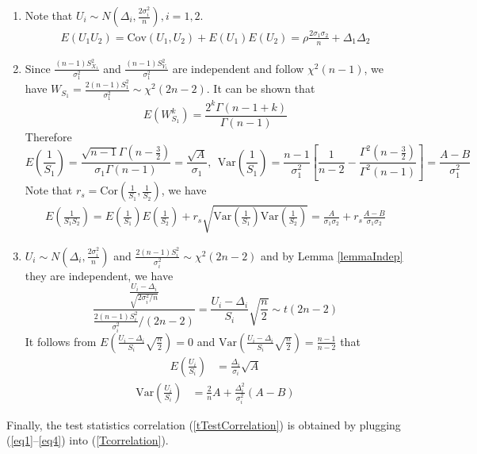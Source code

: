 \documentclass[11pt, a4paper]{article}
\begin{document}
\begin{enumerate}
	\item Note that $U_i\sim N(\Delta_i, \frac{2\sigma_i^2}{n}),  i=1, 2$. 
	\begin{align}\label{eq1}
	E(U_1U_2)= \text{Cov}(U_1, U_2) + E(U_1)E(U_2) = \rho \frac{2\sigma_1\sigma_2}{n} + \Delta_1\Delta_2
	\end{align} 
	\item Since $\frac{(n-1)S_{X_1}^2}{\sigma_1^2}$ and $\frac{(n-1)S_{Y_1}^2}{\sigma_1^2}$ are independent  and follow $\chi^2(n-1)$, we have $W_{S_1}=\frac{2(n-1)S_1^2}{\sigma_1^2}\sim \chi^2(2n-2)$. It can be shown that 
	\[E(W_{S_1}^k)= \frac{2^k\Gamma(n-1+k)}{\Gamma(n-1)}\] 
	Therefore 
	\[E\left(\frac{1}{S_1}\right) = \frac{\sqrt{n-1}\Gamma(n-\frac{3}{2})}{\sigma_1\Gamma(n-1)}=\frac{\sqrt{A}}{\sigma_1},  ~~\text{Var}\left(\frac{1}{S_1}\right)=\frac{n-1}{\sigma_1^2}\left[\frac{1}{n-2} - \frac{\Gamma^2(n-\frac{3}{2})}{\Gamma^2(n-1)}\right]=\frac{A-B}{\sigma_1^2}\]
	Note that $r_s = \text{Cor}(\frac{1}{S_1}, \frac{1}{S_2})$, we have 
	\begin{align}\label{eq2}
	E(\frac{1}{S_1S_2})  = E(\frac{1}{S_1})E(\frac{1}{S_2}) + r_s \sqrt{\text{Var}(\frac{1}{S_1})\text{Var}(\frac{1}{S_2})} = \frac{A}{\sigma_1\sigma_2} + r_s \frac{A-B}{\sigma_1\sigma_2}
	\end{align}
	\item $U_i\sim N(\Delta_i, \frac{2\sigma_i^2}{n})$ and $\frac{2(n-1)S_i^2}{\sigma_i^2} \sim \chi^2(2n-2)$ and by Lemma \ref{lemmaIndep} they are independent, we have 
	\[\frac{\frac{U_i-\Delta_i}{\sqrt{2\sigma_i^2/n}}}{\frac{2(n-1)S_i^2}{\sigma_i^2}/(2n-2)}  = \frac{U_i-\Delta_i}{S_i}\sqrt{\frac{n}{2}}\sim t(2n-2)\]
	It follows from $E\left(\frac{U_i-\Delta_i}{S_i}\sqrt{\frac{n}{2}}\right)=0 $ and $\text{Var}\left(\frac{U_i-\Delta_i}{S_i}\sqrt{\frac{n}{2}}\right) = \frac{n-1}{n-2}$ that
	\begin{align}\label{eq3}
	E\left(\frac{U_i}{S_i}\right) &= \frac{\Delta_i}{\sigma_i}\sqrt{A}
	\end{align}
	\begin{align}\label{eq4}
	\text{Var}\left(\frac{U_i}{S_i}\right)&=\frac{2}{n}A + \frac{\Delta_i^2}{\sigma_i^2}(A-B)
	\end{align}
\end{enumerate}
Finally,  the test statistics correlation (\ref{tTestCorrelation}) is obtained by plugging (\ref{eq1}--\ref{eq4}) into (\ref{Tcorrelation}).
\end{document}
